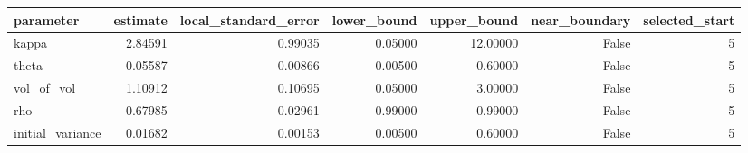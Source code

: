\begin{tabular}{lrrrrrr}
\toprule
parameter & estimate & local\_standard\_error & lower\_bound & upper\_bound & near\_boundary & selected\_start \\
\midrule
kappa & 2.84591 & 0.99035 & 0.05000 & 12.00000 & False & 5 \\
theta & 0.05587 & 0.00866 & 0.00500 & 0.60000 & False & 5 \\
vol\_of\_vol & 1.10912 & 0.10695 & 0.05000 & 3.00000 & False & 5 \\
rho & -0.67985 & 0.02961 & -0.99000 & 0.99000 & False & 5 \\
initial\_variance & 0.01682 & 0.00153 & 0.00500 & 0.60000 & False & 5 \\
\bottomrule
\end{tabular}
